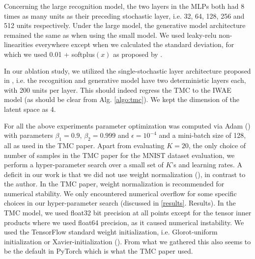 Concerning the large recognition model, the two layers in the MLPs both had 8 times as many units as their preceding stochastic layer, i.e. 32, 64, 128, 256 and 512 units respectively. Under the large model, the generative model architecture remained the same as when using the small model. We used leaky-relu non-linearities everywhere except when we calculated the standard deviation, for which we used 0.01 + softplus$(x)$ as proposed by \cite{tmc}. 

In our ablation study, we utilized the single-stochastic layer architecture proposed in \cite{iwae}, i.e. the recognition and generative model have two deterministic layers each, with 200 units per layer. This should indeed regress the TMC to the IWAE model (as should be clear from Alg. \ref{algo:tmc}). We kept the dimension of the latent space as 4.

For all the above experiments parameter optimization was computed via Adam (\cite{adam}) with parameters $\beta_1=0.9$, $\beta_2=0.999$ and $\epsilon=10^{-4}$ and a mini-batch size of 128, all as used in the TMC paper. Apart from evaluating $K=20$, the only choice of number of samples in the TMC paper for the MNIST dataset evaluation, we perform a hyper-parameter search over a small set of $K$'s and learning rates. A deficit in our work is that we did not use weight normalization (\cite{weightnorm}), in contrast to the author. In the TMC paper, weight normalization is recommended for numerical stability. We only encountered numerical overflow for some specific choices in our hyper-parameter search (discussed in \ref{results}. Results). In the TMC model, we used float32 bit precision at all points except for the tensor inner products where we used float64 precision, as it caused numerical instability. We used the TensorFlow standard weight initialization, i.e. Glorot-uniform initialization or Xavier-initialization (\cite{xavier}). From what we gathered this also seems to be the default in PyTorch which is what the TMC paper used.

